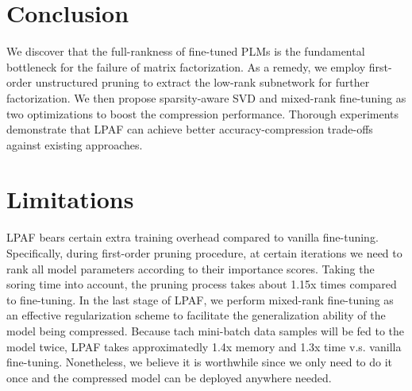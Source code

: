 \section{Conclusion}
We discover that the full-rankness of fine-tuned PLMs is the fundamental bottleneck for the failure of matrix factorization. As a remedy, we employ first-order unstructured pruning to extract the low-rank subnetwork for further factorization. We then propose sparsity-aware SVD and mixed-rank fine-tuning as two optimizations to boost the compression performance. Thorough experiments demonstrate that LPAF can achieve better accuracy-compression trade-offs against existing approaches.


\section*{Limitations}
LPAF bears certain extra training overhead compared to vanilla fine-tuning. Specifically, during first-order pruning procedure, at certain iterations we need to rank all model parameters according to their importance 
scores. Taking the soring time into account, the pruning process takes about 1.15x times compared to fine-tuning. In the last stage of LPAF, we perform mixed-rank fine-tuning as an effective regularization scheme to 
facilitate the generalization ability of the model being compressed. Because tach mini-batch data samples will be fed to the model twice, LPAF takes approximatedly 1.4x memory and 1.3x time v.s. vanilla fine-tuning. Nonetheless, we believe it is worthwhile since we only need to do it once and the compressed model can be deployed anywhere needed.

